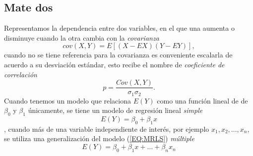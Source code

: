 \subsection{Mate dos}
Representamos la dependencia entre dos variables, en el que una aumenta o disminuye cuando la otra cambia con la \emph{covarianza}
\begin{equation}
cov(X,Y)=E[(X-EX)(Y-EY)],
\end{equation}
cuando no se tiene referencia para la covarianza es conveniente escalarla de acuerdo a su desviación estándar, esto recibe el nombre de  \emph{coeficiente de correlación}
\begin{equation}
p=\frac{Cov(X,Y)}{\sigma_1\sigma_2}.
\end{equation}
Cuando tenemos un modelo que relaciona $E(Y)$ como una función lineal de de $\beta_0$ y $\beta_1$ únicamente, se tiene un modelo de regresión lineal \emph{simple}
\begin{equation}
E(Y)=\beta_0+\beta_1x\label{EQ:MRLS}
\end{equation},
cuando más de una variable independiente de interés, por ejemplo $x_1,x_2,\ldots,x_n$, se utiliza una generalización del modelo (\ref{EQ:MRLS}) \emph{múltiple}
\begin{equation}
E(Y)=\beta_0+\beta_1x+\ldots+\beta_nx_n
\end{equation}